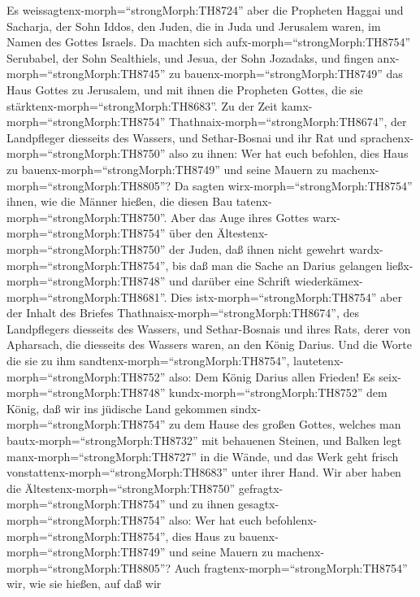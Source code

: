  Es weissagtenx-morph=``strongMorph:TH8724'' aber die
Propheten Haggai und Sacharja, der Sohn Iddos, den Juden, die in Juda
und Jerusalem waren, im Namen des Gottes Israels.  Da
machten sich aufx-morph=``strongMorph:TH8754'' Serubabel, der Sohn
Sealthiels, und Jesua, der Sohn Jozadaks, und fingen
anx-morph=``strongMorph:TH8745'' zu bauenx-morph=``strongMorph:TH8749''
das Haus Gottes zu Jerusalem, und mit ihnen die Propheten Gottes, die
sie stärktenx-morph=``strongMorph:TH8683''.  Zu der Zeit
kamx-morph=``strongMorph:TH8754''
Thathnai\textbar x-morph=``strongMorph:TH8674'', der Landpfleger
diesseits des Wassers, und Sethar-Bosnai und ihr Rat und
sprachenx-morph=``strongMorph:TH8750'' also zu ihnen: Wer hat euch
befohlen, dies Haus zu bauenx-morph=``strongMorph:TH8749'' und seine
Mauern zu machenx-morph=``strongMorph:TH8805''?  Da sagten
wirx-morph=``strongMorph:TH8754'' ihnen, wie die Männer hießen, die
diesen Bau tatenx-morph=``strongMorph:TH8750''.  Aber das
Auge ihres Gottes warx-morph=``strongMorph:TH8754'' über den
Ältestenx-morph=``strongMorph:TH8750'' der Juden, daß ihnen nicht
gewehrt wardx-morph=``strongMorph:TH8754'', bis daß man die Sache an
Darius gelangen ließx-morph=``strongMorph:TH8748'' und darüber eine
Schrift wiederkämex-morph=``strongMorph:TH8681''.  Dies
istx-morph=``strongMorph:TH8754'' aber der Inhalt des Briefes
Thathnais\textbar x-morph=``strongMorph:TH8674'', des Landpflegers
diesseits des Wassers, und Sethar-Bosnais und ihres Rats, derer von
Apharsach, die diesseits des Wassers waren, an den König Darius.
 Und die Worte die sie zu ihm
sandtenx-morph=``strongMorph:TH8754'',
lautetenx-morph=``strongMorph:TH8752'' also: Dem König Darius allen
Frieden!  Es seix-morph=``strongMorph:TH8748''
kundx-morph=``strongMorph:TH8752'' dem König, daß wir ins jüdische Land
gekommen sindx-morph=``strongMorph:TH8754'' zu dem Hause des großen
Gottes, welches man bautx-morph=``strongMorph:TH8732'' mit behauenen
Steinen, und Balken legt manx-morph=``strongMorph:TH8727'' in die Wände,
und das Werk geht frisch vonstattenx-morph=``strongMorph:TH8683'' unter
ihrer Hand.  Wir aber haben die
Ältestenx-morph=``strongMorph:TH8750''
gefragtx-morph=``strongMorph:TH8754'' und zu ihnen
gesagtx-morph=``strongMorph:TH8754'' also: Wer hat euch
befohlenx-morph=``strongMorph:TH8754'', dies Haus zu
bauenx-morph=``strongMorph:TH8749'' und seine Mauern zu
machenx-morph=``strongMorph:TH8805''?  Auch
fragtenx-morph=``strongMorph:TH8754'' wir, wie sie hießen, auf daß wir
